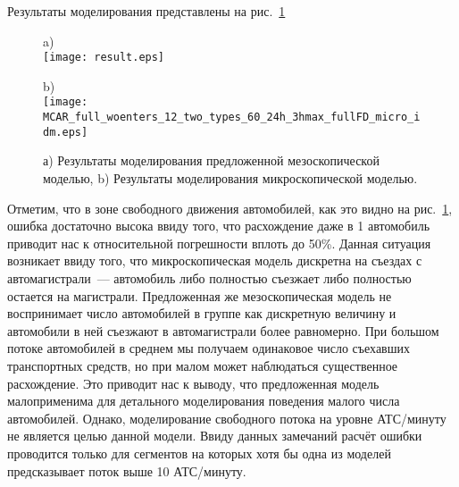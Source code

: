 Результаты моделирования представлены на рис.~\ref{fig:mcar_modelling}
\begin{figure}[!ht]
\centering
\begin{minipage}[b]{0.53\textwidth}
    \centering
    a)
    \\ \texttt{[image: result.eps]}
\end{minipage}
\hfill
\begin{minipage}[b]{0.45\textwidth}
    \centering
    b)
    \\ \texttt{[image: MCAR\_full\_woenters\_12\_two\_types\_60\_24h\_3hmax\_fullFD\_micro\_idm.eps]}
\end{minipage}

\caption{а) Результаты моделирования предложенной мезоскопической моделью, b) Результаты моделирования микроскопической моделью.}
\label{fig:mcar_modelling}
\end{figure}
Отметим, что в зоне свободного движения автомобилей, как это видно на рис.~\ref{fig:mcar_modelling}, ошибка достаточно высока ввиду того, что расхождение даже в 1 автомобиль приводит нас к относительной погрешности вплоть до 50\%.
Данная ситуация возникает ввиду того, что микроскопическая модель дискретна на съездах с автомагистрали~--- автомобиль либо полностью съезжает либо полностью остается на магистрали.
Предложенная же мезоскопическая модель не воспринимает число автомобилей в группе как дискретную величину и автомобили в ней съезжают в автомагистрали более равномерно.
При большом потоке автомобилей в среднем мы получаем одинаковое число съехавших транспортных средств, но при малом может наблюдаться существенное расхождение.
Это приводит нас к выводу, что предложенная модель малоприменима для детального моделирования поведения малого числа автомобилей.
Однако, моделирование свободного потока на уровне АТС/минуту не является целью данной модели.
Ввиду данных замечаний расчёт ошибки проводится только для сегментов на которых хотя бы одна из моделей предсказывает поток выше 10 АТС/минуту.

